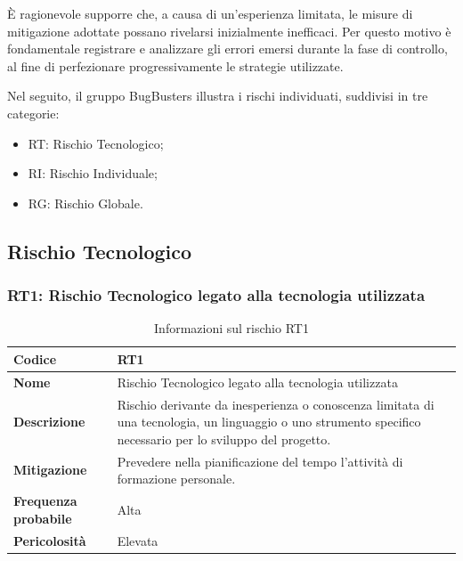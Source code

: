 \documentclass[a4paper,12pt]{article}
\begin{document}
È ragionevole supporre che, a causa di un'esperienza limitata, le misure di mitigazione adottate possano rivelarsi inizialmente inefficaci. Per questo motivo è fondamentale registrare e analizzare gli errori emersi durante la fase di controllo, al fine di perfezionare progressivamente le strategie utilizzate.

Nel seguito, il gruppo BugBusters illustra i rischi individuati, suddivisi in tre categorie:
\begin{itemize}
\item RT: Rischio Tecnologico;
\item RI: Rischio Individuale;
\item RG: Rischio Globale.
\end{itemize}

\subsection{Rischio Tecnologico}

\subsubsection{RT1: Rischio Tecnologico legato alla tecnologia utilizzata}
\begin{table}[H]
\centering
\begin{tabular}{|>{\raggedright\arraybackslash}p{4cm}|>{\raggedright\arraybackslash}p{10cm}|}
\hline
\textbf{Codice} & RT1 \\
\hline
\textbf{Nome} & Rischio Tecnologico legato alla tecnologia utilizzata \\
\hline
\textbf{Descrizione} & Rischio derivante da inesperienza o conoscenza limitata di una tecnologia, un linguaggio o uno strumento specifico necessario per lo sviluppo del progetto. \\
\hline
\textbf{Mitigazione} & Prevedere nella pianificazione del tempo l'attività di formazione personale. \\
\hline
\textbf{Frequenza probabile} & Alta \\
\hline
\textbf{Pericolosità} & Elevata \\
\hline
\end{tabular}
\caption{Informazioni sul rischio RT1}
\label{tab:rt1}
\end{table}
\end{document}
